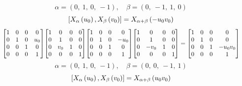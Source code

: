 \documentclass[11pt]{article}
\theoremstyle{definition}
\begin{document}
\[
\alpha = \left( 0, \  1, \  0, \  -1\right), \quad \beta = \left( 0, \  -1, \  1, \  0\right)
\]
\[
\scaletoalign{\textwidth}{\left[ X_{\alpha}\left(u_{0}\right), X_{\beta}\left(v_{0}\right) \right] = X_{\alpha + \beta}\left(- u_{0} v_{0}\right)}
\]
\[
\scaletoalign{\textwidth}{{\left[\begin{matrix}1 & 0 & 0 & 0\\0 & 1 & 0 & u_{0}\\0 & 0 & 1 & 0\\0 & 0 & 0 & 1\end{matrix}\right]} {\left[\begin{matrix}1 & 0 & 0 & 0\\0 & 1 & 0 & 0\\0 & v_{0} & 1 & 0\\0 & 0 & 0 & 1\end{matrix}\right]} {\left[\begin{matrix}1 & 0 & 0 & 0\\0 & 1 & 0 & - u_{0}\\0 & 0 & 1 & 0\\0 & 0 & 0 & 1\end{matrix}\right]} {\left[\begin{matrix}1 & 0 & 0 & 0\\0 & 1 & 0 & 0\\0 & - v_{0} & 1 & 0\\0 & 0 & 0 & 1\end{matrix}\right]} = {\left[\begin{matrix}1 & 0 & 0 & 0\\0 & 1 & 0 & 0\\0 & 0 & 1 & - u_{0} v_{0}\\0 & 0 & 0 & 1\end{matrix}\right]}}
\]
\[
\alpha = \left( 0, \  1, \  0, \  -1\right), \quad \beta = \left( 0, \  0, \  -1, \  1\right)
\]
\[
\scaletoalign{\textwidth}{\left[ X_{\alpha}\left(u_{0}\right), X_{\beta}\left(v_{0}\right) \right] = X_{\alpha + \beta}\left(u_{0} v_{0}\right)}
\]
\end{document}
